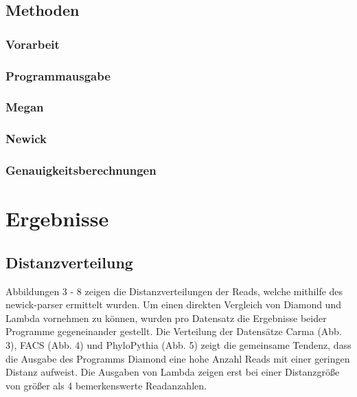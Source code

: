 \documentclass[10pt, a4paper]{article}[08.12.2015]
\begin{document}
    \subsection{Methoden}
      \subsubsection{Vorarbeit}
      \subsubsection{Programmausgabe}
      \subsubsection{Megan}
      \subsubsection{Newick}
      \subsubsection{Genauigkeitsberechnungen}
    
  
    \newpage
  \section{Ergebnisse}
  \subsection{Distanzverteilung}
  
  Abbildungen 3 - 8 zeigen die Distanzverteilungen der Reads, welche mithilfe des newick-parser ermittelt wurden. Um einen direkten Vergleich von Diamond und Lambda vornehmen zu k\"onnen, wurden pro Datensatz die Ergebnisse beider Programme gegeneinander gestellt. Die Verteilung der Datens\"atze Carma (Abb. 3), FACS (Abb. 4) und PhyloPythia (Abb. 5) zeigt die gemeinsame Tendenz, dass die Ausgabe des Programms Diamond eine hohe Anzahl Reads mit einer geringen Distanz aufweist. Die Ausgaben von Lambda zeigen erst bei einer Distanzgr\"o{\ss}e von gr\"o{\ss}er als 4 bemerkenswerte Readanzahlen.
  
\end{document}
